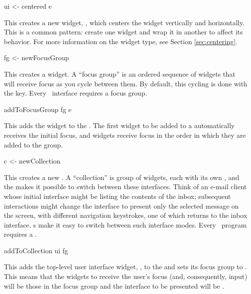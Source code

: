 \begin{haskellcode}
 ui <- centered e
\end{haskellcode}

This creates a new  widget, , which centers the
 widget vertically and horizontally.  This is a common
pattern: create one widget and wrap it in another to affect its
behavior.  For more information on the  widget type, see
Section \ref{sec:centering}.

\begin{haskellcode}
 fg <- newFocusGroup
\end{haskellcode}

This creates a  widget.  A ``focus group'' is an
ordered sequence of widgets that will receive focus as you cycle
between them.  By default, this cycling is done with the  key.
Every \vtyui\ interface requires a focus group.

\begin{haskellcode}
 addToFocusGroup fg e
\end{haskellcode}

This adds the  widget to the .  The first
widget to be added to a  automatically receives the
initial focus, and widgets receive focus in the order in which they
are added to the group.

\begin{haskellcode}
 c <- newCollection
\end{haskellcode}

This creates a new .  A ``collection'' is group of
widgets, each with its own , and the 
makes it possible to switch between these interfaces.  Think of an
e-mail client whose initial interface might be listing the contents of
the inbox; subsequent interactions might change the interface to
present only the selected message on the screen, with different
navigation keystrokes, one of which returns to the inbox interface.
s make it easy to switch between such interface modes.
Every \vtyui\ program requires a .

\begin{haskellcode}
 addToCollection ui fg
\end{haskellcode}

This adds the top-level user interface widget, , to the
 and sets its focus group to .  This means that
the widgets to receive the user’s focus (and, consequently, input)
will be those in the focus group  and the interface to be
presented will be .

